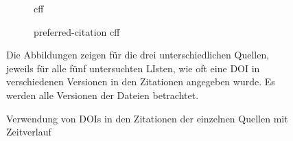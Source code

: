 \begin{figure}
    \begin{subfigure}{.5\textwidth}
        \centering
        
        \caption{\gls{cff}}
        \label{fig:cff_doi_full}
    \end{subfigure}%
    \begin{subfigure}{.5\textwidth}
        \centering
        
        \caption{\glqq preferred-citation\grqq{} \gls{cff}}
        \label{fig:preferred_citation_doi_full}
    \end{subfigure}
    \centering
    \begin{subfigure}{.5\textwidth}
        \centering
        
        \caption{}
        \label{fig:bib_doi_full}
    \end{subfigure}
    \caption{Verwendung von DOIs in den Zitationen der einzelnen Quellen mit Zeitverlauf}
    \small
    Die Abbildungen zeigen für die drei unterschiedlichen Quellen, jeweils für alle fünf untersuchten LIsten, wie oft eine DOI in verschiedenen Versionen in den Zitationen angegeben wurde. Es werden alle Versionen der Dateien betrachtet.
\end{figure}
